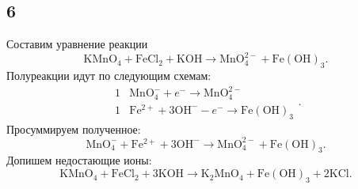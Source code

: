 \subsection{6}

Составим уравнение реакции
\[
\mathrm{KMnO_4}+\mathrm{FeCl_2}+\mathrm{KOH}\longrightarrow\mathrm{MnO_4^{2-}}+\mathrm{Fe(OH)_3}.
\]
Полуреакции идут по следующим схемам:
\[
\begin{array}{r|l}
	1 & \mathrm{MnO_4^{-}}+e^-\longrightarrow\mathrm{MnO_4^{2-}} \\
	1 & \mathrm{Fe^{2+}}+3\mathrm{OH^-}-e^-\longrightarrow\mathrm{Fe(OH)_3}
\end{array}.
\]
Просуммируем полученное:
\[
\mathrm{MnO_4^{-}}+\mathrm{Fe^{2+}}+3\mathrm{OH^-}\longrightarrow\mathrm{MnO_4^{2-}}+\mathrm{Fe(OH)_3}.
\]
Допишем недостающие ионы:
\[
\mathrm{KMnO_4}+\mathrm{FeCl_2}+3\mathrm{KOH}\longrightarrow\mathrm{K_2MnO_4}+\mathrm{Fe(OH)_3}+2\mathrm{KCl}.
\]